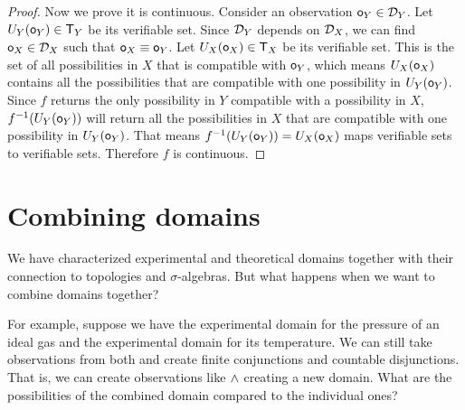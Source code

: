 \documentclass[11pt,letterpaper,fleqn]{memoir} %
\begin{document}
\begin{mathSection}
\begin{proof}
		Now we prove it is continuous. Consider an observation $\mathsf{o}_Y \in \mathcal{D}_Y$. Let $U_Y(\mathsf{o}_Y) \in \mathsf{T}_Y$ be its verifiable set. Since $\mathcal{D}_Y$ depends on $\mathcal{D}_X$, we can find $\mathsf{o}_X \in \mathcal{D}_X$ such that $\mathsf{o}_X \equiv \mathsf{o}_Y$. Let $U_X(\mathsf{o}_X) \in \mathsf{T}_X$ be its verifiable set. This is the set of all possibilities in $X$ that is compatible with $\mathsf{o}_Y$, which means $U_X(\mathsf{o}_X)$ contains all the possibilities that are compatible with one possibility in $U_Y(\mathsf{o}_Y)$. Since $f$ returns the only possibility in $Y$ compatible with a possibility in $X$, $f^{-1}(U_Y(\mathsf{o}_Y))$ will return all the possibilities in $X$ that are compatible with one possibility in $U_Y(\mathsf{o}_Y)$. That means $f^{-1}(U_Y(\mathsf{o}_Y)) = U_X(\mathsf{o}_X)$ maps verifiable sets to verifiable sets. Therefore $f$ is continuous.
	\end{proof}
\end{mathSection}


\section{Combining domains}

We have characterized experimental and theoretical domains together with their connection to topologies and $\sigma$-algebras. But what happens when we want to combine domains together?

For example, suppose we have the experimental domain for the pressure of an ideal gas and the experimental domain for its temperature. We can still take observations from both and create finite conjunctions and countable disjunctions. That is, we can create observations like $\wedge$ creating a new domain. What are the possibilities of the combined domain compared to the individual ones?
\end{document}
